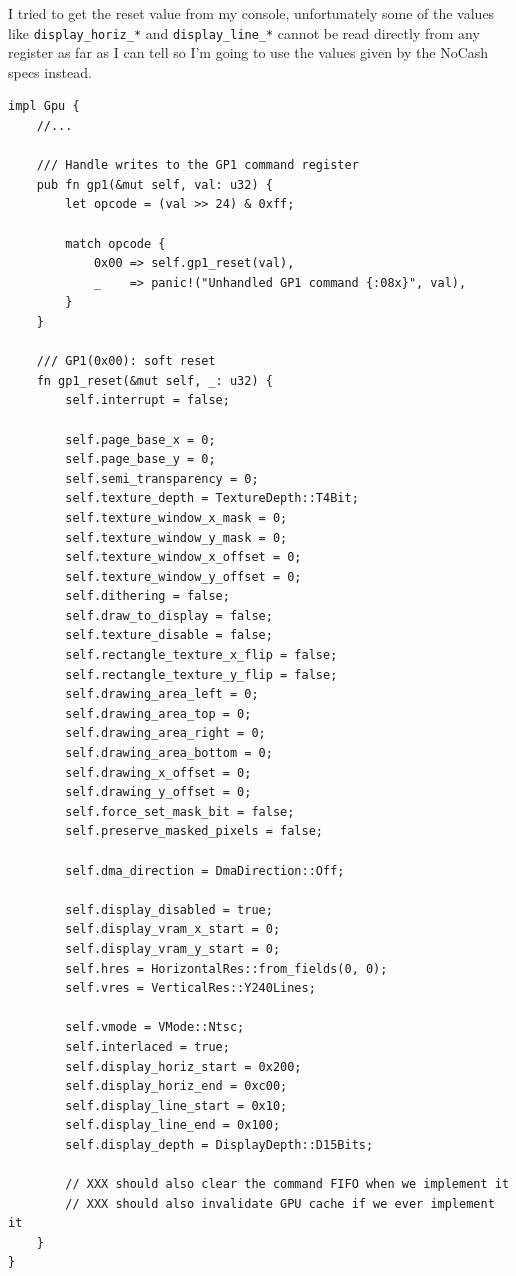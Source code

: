 \documentclass[a4paper]{article}
\newcommand{\code}[1] {\texttt{#1}}
\begin{document}
I tried to get the reset value from my console, unfortunately some of
the values like \code{display\_horiz\_*} and \code{display\_line\_*}
cannot be read directly from any register as far as I can tell so I'm
going to use the values given by the NoCash specs instead.

\begin{lstlisting}
impl Gpu {
    //...

    /// Handle writes to the GP1 command register
    pub fn gp1(&mut self, val: u32) {
        let opcode = (val >> 24) & 0xff;

        match opcode {
            0x00 => self.gp1_reset(val),
            _    => panic!("Unhandled GP1 command {:08x}", val),
        }
    }

    /// GP1(0x00): soft reset
    fn gp1_reset(&mut self, _: u32) {
        self.interrupt = false;

        self.page_base_x = 0;
        self.page_base_y = 0;
        self.semi_transparency = 0;
        self.texture_depth = TextureDepth::T4Bit;
        self.texture_window_x_mask = 0;
        self.texture_window_y_mask = 0;
        self.texture_window_x_offset = 0;
        self.texture_window_y_offset = 0;
        self.dithering = false;
        self.draw_to_display = false;
        self.texture_disable = false;
        self.rectangle_texture_x_flip = false;
        self.rectangle_texture_y_flip = false;
        self.drawing_area_left = 0;
        self.drawing_area_top = 0;
        self.drawing_area_right = 0;
        self.drawing_area_bottom = 0;
        self.drawing_x_offset = 0;
        self.drawing_y_offset = 0;
        self.force_set_mask_bit = false;
        self.preserve_masked_pixels = false;

        self.dma_direction = DmaDirection::Off;

        self.display_disabled = true;
        self.display_vram_x_start = 0;
        self.display_vram_y_start = 0;
        self.hres = HorizontalRes::from_fields(0, 0);
        self.vres = VerticalRes::Y240Lines;

        self.vmode = VMode::Ntsc;
        self.interlaced = true;
        self.display_horiz_start = 0x200;
        self.display_horiz_end = 0xc00;
        self.display_line_start = 0x10;
        self.display_line_end = 0x100;
        self.display_depth = DisplayDepth::D15Bits;

        // XXX should also clear the command FIFO when we implement it
        // XXX should also invalidate GPU cache if we ever implement it
    }
}
\end{lstlisting}
\end{document}
